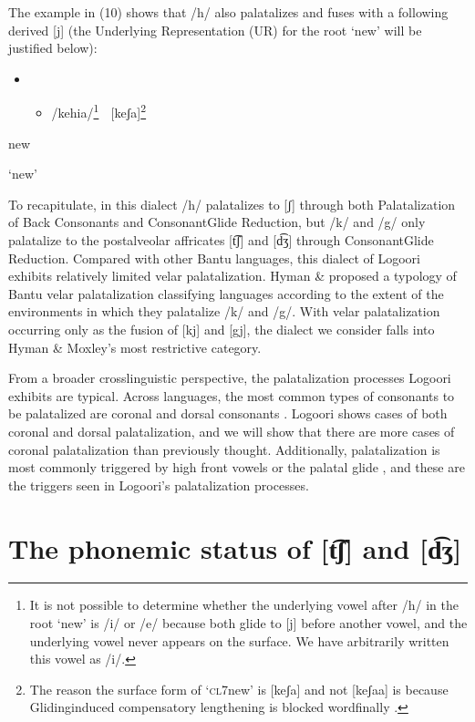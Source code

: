 The example in (10) shows that /h/ also palatalizes and fuses with a following derived [j] (the Underlying Representation (UR) for the root ‘new’ will be justified below):

\begin{itemize}
\item \setcounter{itemize}{0}
\begin{itemize}
\item /kehia/\footnote{   It is not possible to determine whether the underlying vowel after /h/ in the root ‘new’ is /i/ or /e/ because both glide to [j] before another vowel, and the underlying vowel never appears on the surface. We have arbitrarily written this vowel as /i/. }    [keʃa]\footnote{   The reason the surface form of ‘\textsc{cl7}new’ is [keʃa] and not [keʃaa] is because Glidinginduced compensatory lengthening is blocked wordfinally \citep{Leung1991}. }

\end{itemize}
\end{itemize}

new

‘new’

To recapitulate, in this dialect /h/ palatalizes to [ʃ] through both Palatalization of Back Consonants and ConsonantGlide Reduction, but /k/ and /g/ only palatalize to the postalveolar affricates [t͡ʃ] and [d͡ʒ] through ConsonantGlide Reduction. Compared with other Bantu languages, this dialect of Logoori exhibits relatively limited velar palatalization. Hyman \& \citet{Moxley1996} proposed a typology of Bantu velar palatalization classifying languages according to the extent of the environments in which they palatalize /k/ and /g/. With velar palatalization occurring only as the fusion of [kj] and [gj], the dialect we consider falls into Hyman \& Moxley’s most restrictive category. 

From a broader crosslinguistic perspective, the palatalization processes Logoori exhibits are typical. Across languages, the most common types of consonants to be palatalized are coronal and dorsal consonants \citep{Bateman2011}. Logoori shows cases of both coronal and dorsal palatalization, and we will show that there are more cases of coronal palatalization than previously thought. Additionally, palatalization is most commonly triggered by high front vowels or the palatal glide \citep{Bateman2011}, and these are the triggers seen in Logoori’s palatalization processes.

\section{The phonemic status of [t͡ʃ] and [d͡ʒ]} %
